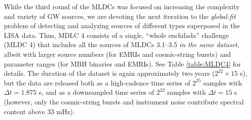 \documentclass{iopart}
\begin{document}
While the third round of the MLDCs was focused on increasing the complexity and variety of GW sources, we are devoting the next iteration to the \emph{global-fit} problem of detecting and analyzing sources of different types superposed in the LISA data. Thus, MDLC 4 consists of a single, ``whole enchilada'' challenge (MLDC 4) that includes all the sources of MLDCs 3.1--3.5 \emph{in the same dataset}, albeit with larger source numbers (for EMRIs and cosmic-string bursts) and parameter ranges (for MBH binaries and EMRIs). See Table \ref{table:MLDC4} for details. The duration of the dataset is again approximately two years ($2^{22} \times 15$ s), but the data are released both as a high-cadence time series of $2^{25}$ samples with $\Delta t = 1.875$ s, and as a downsampled time series of $2^{22}$ samples with $\Delta t = 15$ s (however, only the cosmic-string bursts and instrument noise contribute spectral content above 33 mHz).
%
\end{document}
